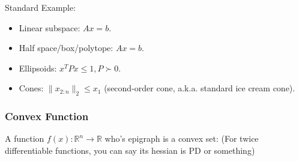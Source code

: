 Standard Example:
\begin{itemize}
    \item Linear subspace: $Ax=b$.
    \item Half space/box/polytope: $Ax = b$.
    \item Ellipsoids: $x^TPx\le 1,P\succ 0$.
    \item Cones: $\lVert x_{2:n} \rVert _2\le x_1$ (second-order cone, a.k.a. standard ice cream cone).
\end{itemize}

\subsubsection{Convex Function}
A function $f(x): \mathbb{R}^n\to \mathbb R$ who's epigraph is a convex set: (For twice differentiable functions, you can say its hessian is PD or something)
